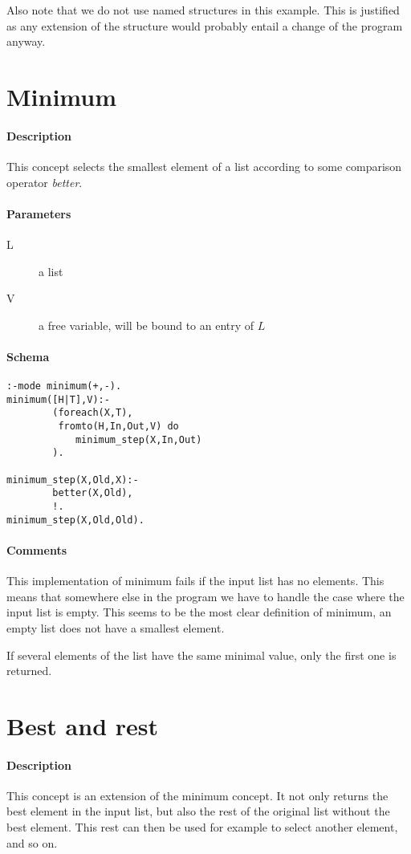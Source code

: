 \documentclass[a4paper,12pt]{report}
\begin{document}
Also note that we do not use named structures in this example. This is justified as any extension of the structure would probably entail a change of the program anyway.
\pagebreak
\section{Minimum}
\paragraph{Description}
This concept selects the smallest element of a list according to some comparison operator {\it better}.
\paragraph{Parameters}
\begin{description}
\item[L] a list
\item[V] a free variable, will be bound to an entry of $L$
\end{description}
\paragraph{Schema}
\begin{verbatim}
:-mode minimum(+,-).
minimum([H|T],V):-
        (foreach(X,T),
         fromto(H,In,Out,V) do
            minimum_step(X,In,Out)
        ).

minimum_step(X,Old,X):-
        better(X,Old),
        !.
minimum_step(X,Old,Old).
\end{verbatim}
\paragraph{Comments}
This implementation of minimum fails if the input list has no elements. This means that somewhere else in the program we have to handle the case where the input list is empty. This seems to be the most clear definition of minimum, an empty list does not have a smallest element.

If several elements of the list have the same minimal value, only the first one is returned.
\pagebreak
\section{Best and rest}
\paragraph{Description}
This concept is an extension of the minimum concept. It not only returns the best element in the input list, but also the rest of the original list without the best element. This rest can then be used for example to select another element, and so on.
\end{document}
